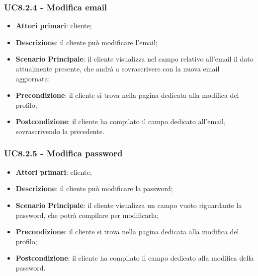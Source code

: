 \subsubsection{UC8.2.4 - Modifica email}
\begin{itemize}
\item \textbf{Attori primari}: cliente;
\item \textbf{Descrizione}: il cliente può modificare l'email;
\item \textbf{Scenario Principale}: il cliente visualizza nel campo relativo all'email il dato attualmente presente, che andrà a sovrascrivere con la nuova email aggiornata;
\item \textbf{Precondizione}: il cliente si trova nella pagina dedicata alla modifica del profilo;
\item \textbf{Postcondizione}: il cliente ha compilato il campo dedicato all'email, sovrascrivendo la precedente.
\end{itemize}

\subsubsection{UC8.2.5 - Modifica password}
\begin{itemize}
\item \textbf{Attori primari}: cliente;
\item \textbf{Descrizione}: il cliente può modificare la password;
\item \textbf{Scenario Principale}: il cliente visualizza un campo vuoto riguardante la password, che potrà compilare per modificarla;
\item \textbf{Precondizione}: il cliente si trova nella pagina dedicata alla modifica del profilo;
\item \textbf{Postcondizione}: il cliente ha compilato il campo dedicato alla modifica della password.
\end{itemize}

